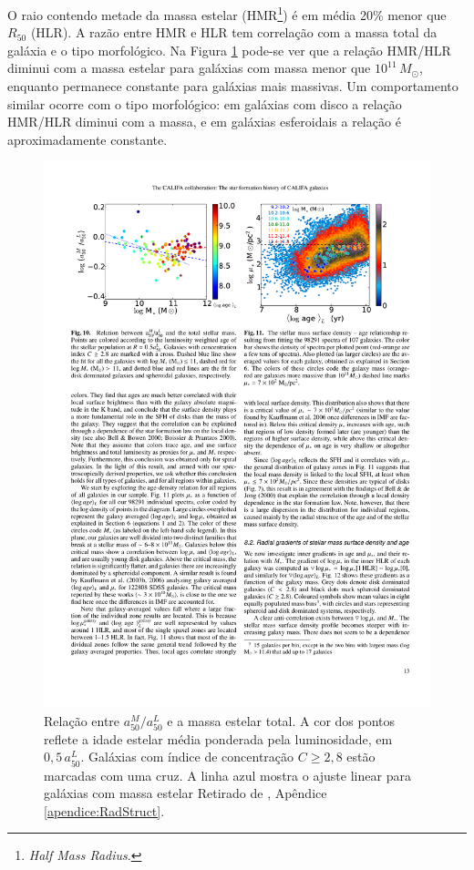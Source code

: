O raio contendo metade da massa estelar (HMR\footnote{{\em Half Mass Radius}.})
é em média 20\% menor que $R_{50}$ (HLR). A razão entre HMR e HLR tem correlação
com a massa total da galáxia e o tipo morfológico. Na Figura
\ref{fig:radStruct2} pode-se ver que a relação HMR/HLR diminui com a massa
estelar para galáxias com massa menor que $10^{11}\,M_\odot$, enquanto permanece
constante para galáxias mais massivas. Um comportamento similar ocorre com o
tipo morfológico:
em galáxias com disco a relação HMR/HLR diminui com a massa, e em galáxias
esferoidais a relação é aproximadamente constante.

\begin{figure}
	\includegraphics{figuras/radstruct-02}
	\caption[Relação entre $a^M_{50}/a^L_{50}$ e a massa estelar total]
	{Relação entre $a^M_{50}/a^L_{50}$ e a massa estelar total. A cor dos
	pontos reflete a idade estelar média ponderada pela luminosidade, em $0,5\,a^L_{50}$.
	Galáxias com índice de concentração $C \geq 2,8$ estão marcadas com uma cruz. A
	linha azul mostra o ajuste linear para galáxias com massa estelar Retirado de
	\cite[figura 10]{GonzalezDelgado2014a}, Apêndice
	\ref{apendice:RadStruct}.}
	\label{fig:radStruct2}
\end{figure}

